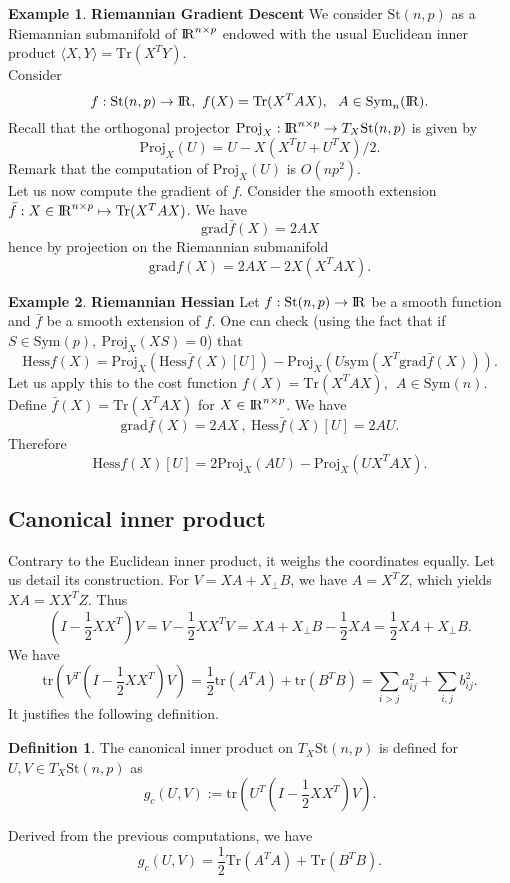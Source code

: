\documentclass[10pt,a4paper]{book}
\theoremstyle{definition}
\newtheorem{defn}{Definition}[section]
\newtheorem{exm}{Example}[section]
\theoremstyle{plain}
\theoremstyle{remark}
\newcommand{\grad}{\textrm{grad}}
\newcommand \Stif {\textrm{St}}
\def\R{{\rm I\kern-0.16em R}}
\begin{document}
\begin{exm}\textbf{Riemannian Gradient Descent}
We consider $\Stif(n,p)$ as a Riemannian submanifold of $\R^{n\times p}$ endowed with the usual Euclidean inner product $\langle X,Y\rangle=\text{Tr}(X^TY)$. \\ Consider
$$f:\Stif(n,p)\to \R,~f(X)=\text{Tr}(X^TAX),~~A \in \text{Sym}_n(\R).$$
Recall that the orthogonal projector $\text{Proj}_X:\R^{n\times p} \to T_X\Stif(n,p)$ is given by
$$\text{Proj}_X(U)=U-X(X^TU+U^TX)/2.$$
Remark that the computation of $\text{Proj}_X(U)$ is $O(np^2)$.  \\ Let us now compute the gradient of $f$. Consider the smooth extension $\bar{f}:X\in \R^{n\times p}\mapsto \text{Tr}(X^{T}AX)$. We have
$$\grad \bar{f}(X)=2AX$$
hence by projection on the Riemannian submanifold
$$\grad f(X)=2AX-2X(X^TAX).$$
\end{exm}
\begin{exm}\textbf{Riemannian Hessian}
Let $f:\Stif(n,p)\to \R$ be a smooth function and $\bar{f}$ be a smooth extension of $f$.  One can check (using the fact that if $S\in \text{Sym}(p),~\text{Proj}_X(XS)=0$) that
$$\text{Hess}f(X)=\text{Proj}_X(\text{Hess}\bar{f}(X)[U])-\text{Proj}_X(U\text{sym}(X^T\grad \bar{f}(X))).$$
Let us apply this to the cost function $f(X)=\text{Tr}(X^TAX),~~A\in \text{Sym}(n)$.
Define $\bar{f}(X)=\text{Tr}(X^TAX)$ for $X\in \R^{n\times p}$. We have
$$\grad \bar{f}(X)=2AX~,~\text{Hess}\bar{f}(X)[U]=2AU.$$
Therefore
$$\text{Hess}f(X)[U]=2\text{Proj}_X(AU)-\text{Proj}_X(UX^TAX).$$
\end{exm}

\subsection{Canonical inner product}
 Contrary to the Euclidean inner product, it weighs the coordinates equally. Let us detail its construction. For $V=XA+X_{\bot}B$, we have $A=X^{T}Z$, which yields $XA=XX^{T}Z$. Thus
$$(I-\frac{1}{2}XX^{T})V=V-\frac{1}{2}XX^{T}V=XA+X_{\bot}B-\frac{1}{2}XA=\frac{1}{2}XA+X_{\bot}B.$$
We have
$$\text{tr}(V^{T}(I-\frac{1}{2}XX^{T})V)=\frac{1}{2}\text{tr}(A^TA)+\text{tr}(B^TB)=\sum_{i>j}a^2_{ij}+\sum_{i,j}b^2_{ij}.$$
It justifies the following definition.
\begin{defn}
The canonical inner product on $T_{X}\Stif(n,p)$ is defined for $U,V \in T_X\Stif(n,p)$ as
$$g_c(U,V):=\text{tr}(U^{T}(I-\frac{1}{2}XX^T)V).$$
\end{defn}
Derived from the previous computations, we have
$$g_c(U,V)=\frac{1}{2}\text{Tr}(A^TA)+\text{Tr}(B^TB).$$
\end{document}
